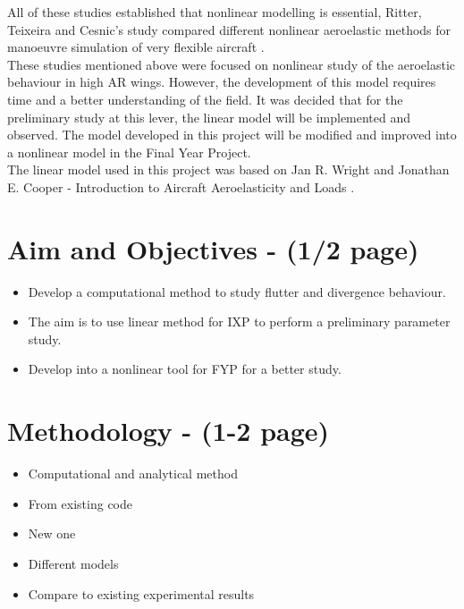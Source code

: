 \documentclass{article}
\begin{document}
All of these studies established that nonlinear modelling is essential, Ritter, Teixeira and Cesnic's study compared different nonlinear aeroelastic methods for manoeuvre simulation of very flexible aircraft \cite{Ritter2018ComparisonAircraft}.\\

These studies mentioned above were focused on nonlinear study of the aeroelastic behaviour in high AR wings. However, the development of this model requires time and a better understanding of the field. It was decided that for the preliminary study at this lever, the linear model will be implemented and observed. The model developed in this project will be modified and improved into a nonlinear model in the Final Year Project.\\

The linear model used in this project was based on Jan R. Wright and Jonathan E. Cooper - Introduction to Aircraft Aeroelasticity and Loads \cite{Wright2015INTRODUCTIONLOADS}. 


\section{Aim and Objectives - (1/2 page)}
\begin{itemize}
    \item Develop a computational method to study flutter and divergence behaviour.
    \item The aim is to use linear method for IXP to perform a preliminary parameter study.
    \item Develop into a nonlinear tool for FYP for a better study.
\end{itemize}

\section{Methodology - (1-2 page)}
\begin{itemize}
    \item Computational and analytical method
    \item From existing code
    \item New one
    \item Different models
    \item Compare to existing experimental results
\end{itemize}

\end{document}
